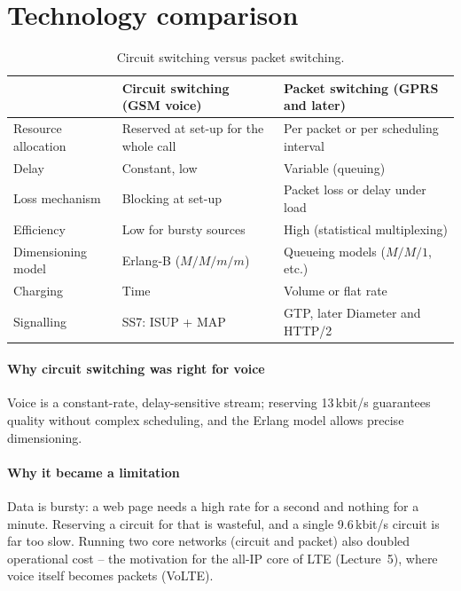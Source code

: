\documentclass[11pt,a4paper]{article}
\begin{document}
\section{Technology comparison}
\begin{table}[htbp]
\centering\small
\caption{Circuit switching versus packet switching.}\label{tab:csps}
\begin{tabularx}{\linewidth}{@{}l Y Y@{}}
\toprule
{} & Circuit switching (GSM voice) & Packet switching (GPRS and later) \\
\midrule
Resource allocation & Reserved at set-up for the whole call & Per packet or per scheduling interval \\
Delay               & Constant, low                          & Variable (queuing) \\
Loss mechanism      & Blocking at set-up                     & Packet loss or delay under load \\
Efficiency          & Low for bursty sources                 & High (statistical multiplexing) \\
Dimensioning model  & Erlang-B ($M/M/m/m$)                   & Queueing models ($M/M/1$, etc.) \\
Charging            & Time                                   & Volume or flat rate \\
Signalling          & SS7: ISUP + MAP                        & GTP, later Diameter and HTTP/2 \\
\bottomrule
\end{tabularx}
\end{table}

\paragraph{Why circuit switching was right for voice} Voice is a constant-rate, delay-sensitive
stream; reserving 13\,kbit/s guarantees quality without complex scheduling, and the Erlang
model allows precise dimensioning. \paragraph{Why it became a limitation} Data is bursty: a
web page needs a high rate for a second and nothing for a minute. Reserving a circuit for
that is wasteful, and a single 9.6\,kbit/s circuit is far too slow. Running two core
networks (circuit and packet) also doubled operational cost -- the motivation for the
all-IP core of LTE (Lecture~5), where voice itself becomes packets (VoLTE).
\end{document}
